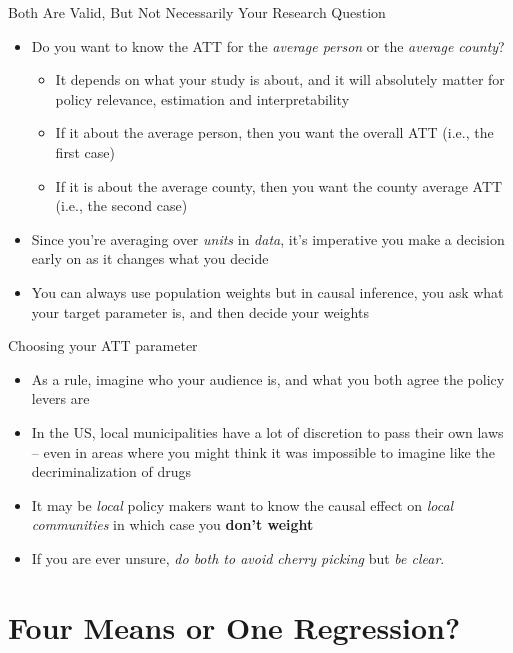 \documentclass{beamer}
\begin{document}
\begin{frame}{Both Are Valid, But Not Necessarily Your Research Question}

\begin{itemize}
\item Do you want to know the ATT for the \emph{average person} or the \emph{average county}?
	\begin{itemize}
	\item It depends on what your study is about, and it will absolutely matter for policy relevance, estimation and interpretability
	\item If it about the average person, then you want the overall ATT (i.e., the first case)
	\item If it is about the average county, then you want the county average ATT (i.e., the second case)
	\end{itemize}
\item Since you're averaging over \emph{units} in \emph{data}, it's imperative you make a decision early on as it changes what you decide
\item You can always use population weights but in causal inference, you ask what your target parameter is, and then decide your weights
\end{itemize}

\end{frame}

\begin{frame}{Choosing your ATT parameter}

\begin{itemize}

\item As a rule, imagine who your audience is, and what you both agree the policy levers are
\item In the US, local municipalities have a lot of discretion to pass their own laws -- even in areas where you might think it was impossible to imagine like the decriminalization of drugs
\item It may be \emph{local} policy makers want to know the causal effect on \emph{local communities} in which case you \textbf{don't weight}
\item If you are ever unsure, \emph{do both to avoid cherry picking} but \emph{be clear}.

\end{itemize}

\end{frame}


\section{Four Means or One Regression?}
\end{document}
